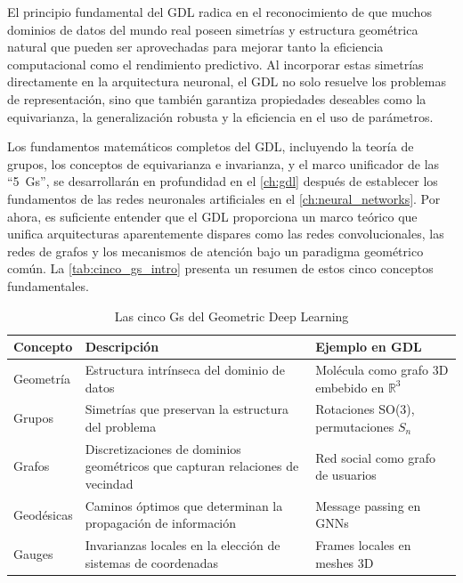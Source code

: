 El principio fundamental del \gls{GDL} radica en el reconocimiento de que muchos dominios de datos del mundo real poseen simetrías y estructura geométrica natural que pueden ser aprovechadas para mejorar tanto la eficiencia computacional como el rendimiento predictivo. Al incorporar estas simetrías directamente en la arquitectura neuronal, el \gls{GDL} no solo resuelve los problemas de representación, sino que también garantiza propiedades deseables como la equivarianza, la generalización robusta y la eficiencia en el uso de parámetros.

Los fundamentos matemáticos completos del \gls{GDL}, incluyendo la teoría de grupos, los conceptos de equivarianza e invarianza, y el marco unificador de las ``5~Gs'', se desarrollarán en profundidad en el \autoref{ch:gdl} después de establecer los fundamentos de las redes neuronales artificiales en el \autoref{ch:neural_networks}. Por ahora, es suficiente entender que el \gls{GDL} proporciona un marco teórico que unifica arquitecturas aparentemente dispares como las redes convolucionales, las redes de grafos y los mecanismos de atención bajo un paradigma geométrico común. La \autoref{tab:cinco_gs_intro} presenta un resumen de estos cinco conceptos fundamentales.

\begin{table}[h]
\centering
\caption{Las cinco Gs del Geometric Deep Learning}
\label{tab:cinco_gs_intro}
\begin{tabular}{@{}lp{6cm}p{4.5cm}@{}}
\toprule
\textbf{Concepto} & \textbf{Descripción} & \textbf{Ejemplo en GDL} \\
\midrule
Geometría & Estructura intrínseca del dominio de datos & Molécula como grafo 3D embebido en $\mathbb{R}^3$ \\
\addlinespace
Grupos & Simetrías que preservan la estructura del problema & Rotaciones SO(3), permutaciones $S_n$ \\
\addlinespace
Grafos & Discretizaciones de dominios geométricos que capturan relaciones de vecindad & Red social como grafo de usuarios \\
\addlinespace
Geodésicas & Caminos óptimos que determinan la propagación de información & Message passing en GNNs \\
\addlinespace
Gauges & Invarianzas locales en la elección de sistemas de coordenadas & Frames locales en meshes 3D \\
\bottomrule
\end{tabular}
\end{table}


